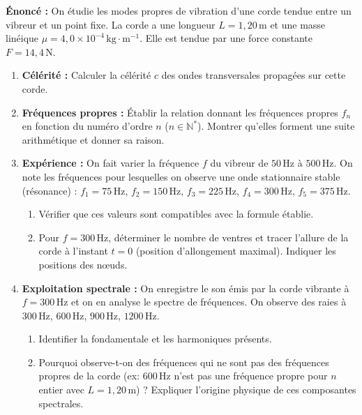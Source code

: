 \documentclass[11pt]{article}
\begin{document}
\begin{exercice}
\textbf{Énoncé :} On étudie les modes propres de vibration d'une corde tendue entre un vibreur et un point fixe. La corde a une longueur $L = 1,20\,\text{m}$ et une masse linéique $\mu = 4,0 \times 10^{-4}\,\text{kg}\cdot\text{m}^{-1}$. Elle est tendue par une force constante $F = 14,4\,\text{N}$.

\begin{enumerate}
    \item \textbf{Célérité :} Calculer la célérité $c$ des ondes transversales propagées sur cette corde.
    \item \textbf{Fréquences propres :} Établir la relation donnant les fréquences propres $f_n$ en fonction du numéro d'ordre $n$ ($n \in \mathbb{N}^*$). Montrer qu'elles forment une suite arithmétique et donner sa raison.
    \item \textbf{Expérience :} On fait varier la fréquence $f$ du vibreur de $50\,\text{Hz}$ à $500\,\text{Hz}$. On note les fréquences pour lesquelles on observe une onde stationnaire stable (résonance) : $f_1 = 75\,\text{Hz}$, $f_2 = 150\,\text{Hz}$, $f_3 = 225\,\text{Hz}$, $f_4 = 300\,\text{Hz}$, $f_5 = 375\,\text{Hz}$.
    \begin{enumerate}
        \item Vérifier que ces valeurs sont compatibles avec la formule établie.
        \item Pour $f = 300\,\text{Hz}$, déterminer le nombre de ventres et tracer l'allure de la corde à l'instant $t=0$ (position d'allongement maximal). Indiquer les positions des nœuds.
    \end{enumerate}
    \item \textbf{Exploitation spectrale :} On enregistre le son émis par la corde vibrante à $f = 300\,\text{Hz}$ et on en analyse le spectre de fréquences. On observe des raies à $300\,\text{Hz}$, $600\,\text{Hz}$, $900\,\text{Hz}$, $1200\,\text{Hz}$.
    \begin{enumerate}
        \item Identifier la fondamentale et les harmoniques présents.
        \item Pourquoi observe-t-on des fréquences qui ne sont pas des fréquences propres de la corde (ex: $600\,\text{Hz}$ n'est pas une fréquence propre pour $n$ entier avec $L=1,20\,\text{m}$) ? Expliquer l'origine physique de ces composantes spectrales.
    \end{enumerate}
\end{enumerate}
\end{exercice}
\end{document}
